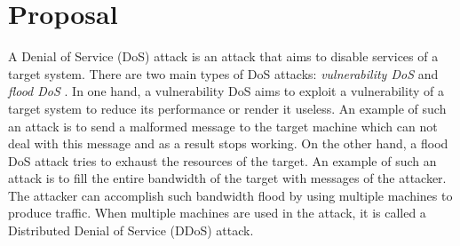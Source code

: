 \section{Proposal} \label{sec:introduction}
A Denial of Service (DoS) attack is an attack that aims to disable services of a target system. There are two main types of DoS attacks: \textit{vulnerability DoS} and \textit{flood DoS} \cite{Lin2013}. In one hand, a vulnerability DoS aims to exploit a vulnerability of a target system to reduce its performance or render it useless. An example of such an attack is to send a malformed message to the target machine which can not deal with this message and as a result stops working. On the other hand, a flood DoS attack tries to exhaust the resources of the target. An example of such an attack is to fill the entire bandwidth of the target with messages of the attacker. The attacker can accomplish such bandwidth flood by using multiple machines to produce traffic. When multiple machines are used in the attack, it is called a Distributed Denial of Service (DDoS) attack.  




